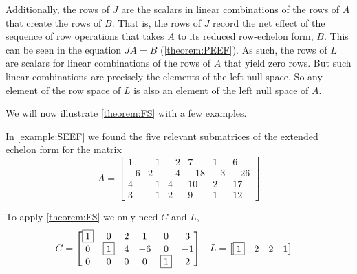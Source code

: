 \documentclass{ximera}
\begin{document}
Additionally, the rows of $J$ are the scalars in linear combinations
of the rows of $A$ that create the rows of $B$.  That is, the rows of
$J$ record the net effect of the sequence of row operations that takes
$A$ to its reduced row-echelon form, $B$.  This can be seen in the
equation $JA=B$ (\ref{theorem:PEEF}).  As such, the rows of $L$ are
scalars for linear combinations of the rows of $A$ that yield zero
rows.  But such linear combinations are precisely the elements of the
left null space.  So any element of the row space of $L$ is also an
element of the left null space of $A$.

We will now illustrate \ref{theorem:FS} with a few examples.

\begin{example}

  In \ref{example:SEEF} we found the five relevant submatrices of the
  extended echelon form for the matrix
  \[
    A=
    \begin{bmatrix}
      1 & -1 & -2 & 7 & 1 & 6 \\
      -6 & 2 & -4 & -18 & -3 & -26 \\
      4 & -1 & 4 & 10 & 2 & 17 \\
      3 & -1 & 2 & 9 & 1 & 12
    \end{bmatrix}
  \]
  
  To apply \ref{theorem:FS} we only need $C$ and $L$,
  \begin{align*}
    C&=
       \begin{bmatrix}
         \fbox{1} &                0 & 2 & 1 &                0 & 3 \\
         0 & \fbox{1} & 4 & -6 &               0 & -1 \\
         0 &                0 & 0 & 0 & \fbox{1} & 2
       \end{bmatrix}
                                                                   &
                                                                     L&=
                                                                        \begin{bmatrix}
                                                                          \fbox{1} & 2 & 2 & 1
                                                                        \end{bmatrix}
  \end{align*}
  

\end{example}
\end{document}
